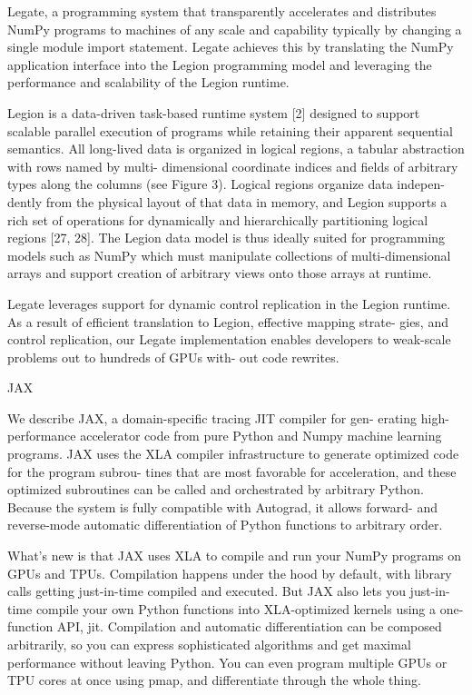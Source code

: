 \documentclass[10pt,a4paper]{article}
\begin{document}
Legate, a programming system that transparently accelerates and distributes NumPy programs to machines of any scale and capability typically by changing a single module import statement. Legate achieves this by translating the NumPy application interface into the Legion programming model and leveraging the performance and scalability of the Legion runtime.

Legion is a data-driven task-based runtime system [2] designed to support scalable parallel execution of programs while retaining their apparent sequential semantics. All long-lived data is organized in logical regions, a tabular abstraction with rows named by multi- dimensional coordinate indices and fields of arbitrary types along the columns (see Figure 3). Logical regions organize data indepen- dently from the physical layout of that data in memory, and Legion supports a rich set of operations for dynamically and hierarchically partitioning logical regions [27, 28]. The Legion data model is thus ideally suited for programming models such as NumPy which must manipulate collections of multi-dimensional arrays and support creation of arbitrary views onto those arrays at runtime.

Legate leverages support for dynamic control replication in the Legion runtime. As a result of efficient translation to Legion, effective mapping strate- gies, and control replication, our Legate implementation enables developers to weak-scale problems out to hundreds of GPUs with- out code rewrites.

JAX

We describe JAX, a domain-specific tracing JIT compiler for gen- erating high-performance accelerator code from pure Python and Numpy machine learning programs. JAX uses the XLA compiler infrastructure to generate optimized code for the program subrou- tines that are most favorable for acceleration, and these optimized subroutines can be called and orchestrated by arbitrary Python. Because the system is fully compatible with Autograd, it allows forward- and reverse-mode automatic differentiation of Python functions to arbitrary order.

What’s new is that JAX uses XLA to compile and run your NumPy programs on GPUs and TPUs. Compilation happens under the hood by default, with library calls getting just-in-time compiled and executed. But JAX also lets you just-in-time compile your own Python functions into XLA-optimized kernels using a one-function API, jit. Compilation and automatic differentiation can be composed arbitrarily, so you can express sophisticated algorithms and get maximal performance without leaving Python. You can even program multiple GPUs or TPU cores at once using pmap, and differentiate through the whole thing.
\end{document}
